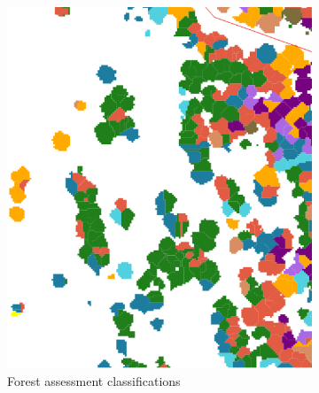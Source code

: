 \documentclass{subfiles}
\begin{document}
\begin{figure} [h!]
\begin{subfigure}[t]{.5\textwidth}
	   		\includegraphics[width=.9\textwidth]{img/NewForest/Area1Classifications}
	   		\caption{Forest assessment classifications} 
	   		\label{fig:Area1Classifications}
	   	\end{subfigure}
	   	\begin{subfigure}[t]{.5\textwidth}
	   		

\end{subfigure}
\end{figure}
\end{document}
